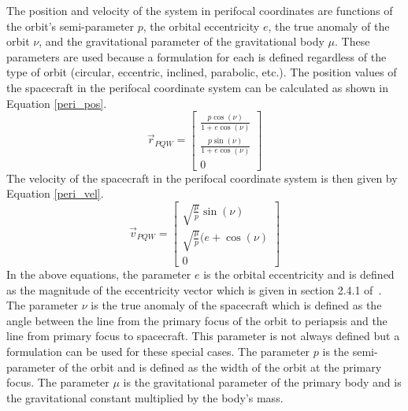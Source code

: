 The position and velocity of the system in perifocal coordinates are functions
of the orbit's semi-parameter $p$, the orbital eccentricity $e$, the true anomaly
of the orbit $\nu$, and the gravitational parameter of the gravitational body $\mu$.  These parameters are used because a formulation for each is
defined regardless of the type of orbit (circular, eccentric, inclined,
parabolic, etc.).  The position values of the spacecraft in the perifocal
coordinate system can be calculated as shown in Equation \ref{peri_pos}.
\begin{equation}
\vec{r}_{PQW}=\begin{bmatrix} \frac{p\cos (\nu)}{1+e\cos (\nu)} \\
                              \frac{p\sin (\nu)}{1+e\cos (\nu)} \\
                              0 \end{bmatrix}
\label{peri_pos}
\end{equation}
The velocity of the spacecraft in the perifocal coordinate system is
then given by Equation \ref{peri_vel}.
\begin{equation}
\vec{v}_{PQW}=\begin{bmatrix} \sqrt{\frac{\mu}{p}}\sin (\nu) \\
                              \sqrt{\frac{\mu}{p}}(e+\cos (\nu) \\
                              0 \end{bmatrix}
\label{peri_vel}
\end{equation}
In the above equations, the parameter $e$ is the orbital eccentricity and is
defined as the magnitude of the eccentricity vector which is given in section
2.4.1 of~\cite{Vallado}.  The parameter $\nu$ is the true anomaly of the
spacecraft which is defined as the angle between the line from the primary
focus of the orbit to periapsis and the line from primary focus to spacecraft.
  This parameter is not always defined but a formulation can be used for these
special cases.  The parameter $p$ is the semi-parameter of the orbit and is
defined as the width of the orbit at the primary focus.  The parameter $\mu$
is the gravitational parameter of the primary body and is the gravitational
constant multiplied by the body's mass.

